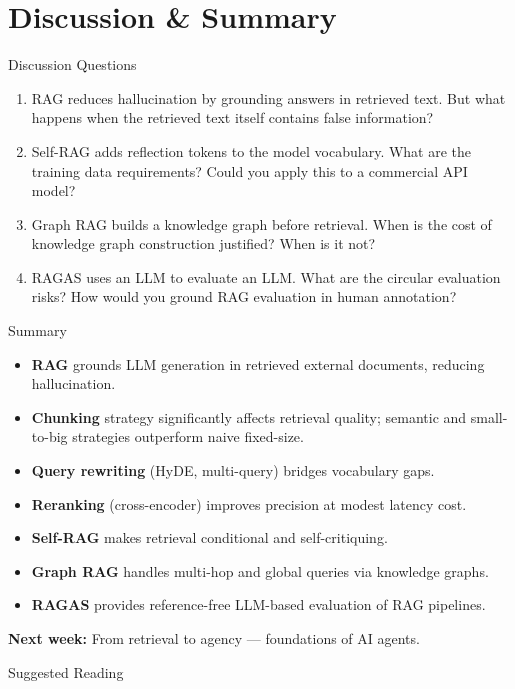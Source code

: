 \documentclass[aspectratio=169,10pt]{beamer}
\begin{document}
\section{Discussion \& Summary}
\begin{frame}{Discussion Questions}
  \begin{enumerate}
    \item RAG reduces hallucination by grounding answers in retrieved text. But what happens when the retrieved text itself contains false information?
    \item Self-RAG adds reflection tokens to the model vocabulary. What are the training data requirements? Could you apply this to a commercial API model?
    \item Graph RAG builds a knowledge graph before retrieval. When is the cost of knowledge graph construction justified? When is it not?
    \item RAGAS uses an LLM to evaluate an LLM. What are the circular evaluation risks? How would you ground RAG evaluation in human annotation?
  \end{enumerate}
\end{frame}

\begin{frame}{Summary}
  \begin{itemize}
    \item \textbf{RAG} grounds LLM generation in retrieved external documents, reducing hallucination.
    \item \textbf{Chunking} strategy significantly affects retrieval quality; semantic and small-to-big strategies outperform naive fixed-size.
    \item \textbf{Query rewriting} (HyDE, multi-query) bridges vocabulary gaps.
    \item \textbf{Reranking} (cross-encoder) improves precision at modest latency cost.
    \item \textbf{Self-RAG} makes retrieval conditional and self-critiquing.
    \item \textbf{Graph RAG} handles multi-hop and global queries via knowledge graphs.
    \item \textbf{RAGAS} provides reference-free LLM-based evaluation of RAG pipelines.
  \end{itemize}
  \vspace{0.3em}
  \textbf{Next week:} From retrieval to agency — foundations of AI agents.
\end{frame}

\begin{frame}[allowframebreaks]{Suggested Reading}
  \nocite{lewis2020retrieval, asai2023selfrag, edge2024graphrag, es2023ragas,
          karpukhin2020dpr, khattab2020colbert}
  
\end{frame}
\end{document}

